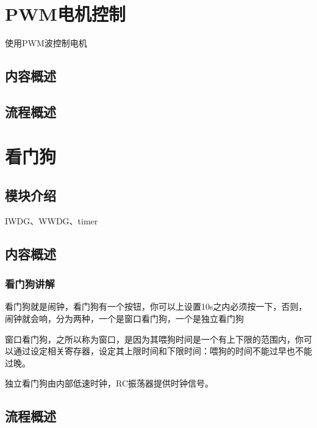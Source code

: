 \documentclass[UTF8]{ctexart}
\begin{document}
\section{PWM电机控制}
使用PWM波控制电机
\subsection{内容概述}
\subsection{流程概述}

\section{看门狗}

\subsection{模块介绍}
IWDG、WWDG、timer
\subsection{内容概述}
\subsubsection{看门狗讲解}
看门狗就是闹钟，看门狗有一个按钮，你可以上设置10s之内必须按一下，否则，闹钟就会响，分为两种，一个是窗口看门狗，一个是独立看门狗

窗口看门狗，之所以称为窗口，是因为其喂狗时间是一个有上下限的范围内，你可以通过设定相关寄存器，设定其上限时间和下限时间：喂狗的时间不能过早也不能过晚。

独立看门狗由内部低速时钟，RC振荡器提供时钟信号。

\subsection{流程概述}
\end{document}
